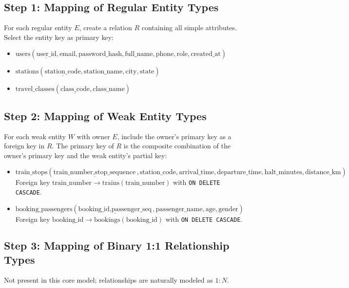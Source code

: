 \documentclass[12pt,a4paper]{report}
\begin{document}
\subsection*{Step 1: Mapping of Regular Entity Types}
For each regular entity $E$, create a relation $R$ containing all simple attributes. Select the entity key as primary key:
\begin{itemize}
    \item $\text{users}(\underline{\text{user\_id}}, \text{email}, \text{password\_hash}, \text{full\_name}, \text{phone}, \text{role}, \text{created\_at})$
    \item $\text{stations}(\underline{\text{station\_code}}, \text{station\_name}, \text{city}, \text{state})$
    \item $\text{travel\_classes}(\underline{\text{class\_code}}, \text{class\_name})$
\end{itemize}

\subsection*{Step 2: Mapping of Weak Entity Types}
For each weak entity $W$ with owner $E$, include the owner's primary key as a foreign key in $R$. The primary key of $R$ is the composite combination of the owner's primary key and the weak entity's partial key:
\begin{itemize}
    \item $\text{train\_stops}(\underline{\text{train\_number}, \text{stop\_sequence}}, \text{station\_code}, \text{arrival\_time}, \text{departure\_time}, \text{halt\_minutes}, \text{distance\_km})$\\
    Foreign key $\text{train\_number} \to \text{trains}(\text{train\_number})$ with \texttt{ON DELETE CASCADE}.
    \item $\text{booking\_passengers}(\underline{\text{booking\_id}, \text{passenger\_seq}}, \text{passenger\_name}, \text{age}, \text{gender})$\\
    Foreign key $\text{booking\_id} \to \text{bookings}(\text{booking\_id})$ with \texttt{ON DELETE CASCADE}.
\end{itemize}

\subsection*{Step 3: Mapping of Binary 1:1 Relationship Types}
Not present in this core model; relationships are naturally modeled as $1:N$.
\end{document}
